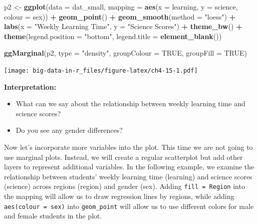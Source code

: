 \documentclass[]{book}
\newenvironment{Shaded}{\begin{snugshade}}{\end{snugshade}}
\newcommand{\DataTypeTok}[1]{\textcolor[rgb]{0.13,0.29,0.53}{#1}}
\newcommand{\KeywordTok}[1]{\textcolor[rgb]{0.13,0.29,0.53}{\textbf{#1}}}
\newcommand{\NormalTok}[1]{#1}
\newcommand{\OperatorTok}[1]{\textcolor[rgb]{0.81,0.36,0.00}{\textbf{#1}}}
\newcommand{\OtherTok}[1]{\textcolor[rgb]{0.56,0.35,0.01}{#1}}
\newcommand{\StringTok}[1]{\textcolor[rgb]{0.31,0.60,0.02}{#1}}
\providecommand{\tightlist}{%
  \setlength{\itemsep}{0pt}\setlength{\parskip}{0pt}}
\begin{document}
\begin{Shaded}
\begin{Highlighting}[]
\NormalTok{p2 <-}\StringTok{ }\KeywordTok{ggplot}\NormalTok{(}\DataTypeTok{data =}\NormalTok{ dat_small,}
             \DataTypeTok{mapping =} \KeywordTok{aes}\NormalTok{(}\DataTypeTok{x =}\NormalTok{ learning, }\DataTypeTok{y =}\NormalTok{ science,}
                           \DataTypeTok{colour =}\NormalTok{ sex)) }\OperatorTok{+}
\StringTok{  }\KeywordTok{geom_point}\NormalTok{() }\OperatorTok{+}
\StringTok{  }\KeywordTok{geom_smooth}\NormalTok{(}\DataTypeTok{method =} \StringTok{"loess"}\NormalTok{) }\OperatorTok{+}
\StringTok{  }\KeywordTok{labs}\NormalTok{(}\DataTypeTok{x =} \StringTok{"Weekly Learning Time"}\NormalTok{, }\DataTypeTok{y =} \StringTok{"Science Scores"}\NormalTok{) }\OperatorTok{+}
\StringTok{  }\KeywordTok{theme_bw}\NormalTok{() }\OperatorTok{+}
\StringTok{  }\KeywordTok{theme}\NormalTok{(}\DataTypeTok{legend.position =} \StringTok{"bottom"}\NormalTok{,}
        \DataTypeTok{legend.title =} \KeywordTok{element_blank}\NormalTok{())}

\KeywordTok{ggMarginal}\NormalTok{(p2, }\DataTypeTok{type =} \StringTok{"density"}\NormalTok{, }\DataTypeTok{groupColour =} \OtherTok{TRUE}\NormalTok{, }\DataTypeTok{groupFill =} \OtherTok{TRUE}\NormalTok{)}
\end{Highlighting}
\end{Shaded}

\texttt{[image: big-data-in-r\_files/figure-latex/ch4-15-1.pdf]}

\textbf{Interpretation:}

\begin{itemize}
\tightlist
\item
  What can we say about the relationship between weekly learning time and science scores?
\item
  Do you see any gender differences?
\end{itemize}

Now let's incorporate more variables into the plot. This time we are not going to use marginal plots. Instead, we will create a regular scatterplot but add other layers to represent additional variables. In the following example, we examine the relationship between students' weekly learning time (learning) and science scores (science) across regions (region) and gender (sex). Adding \texttt{fill\ =\ Region} into the mapping will allow us to draw regression lines by regions, while adding \texttt{aes(colour\ =\ sex)} into \texttt{geom\_point} will allow us to use different colors for male and female students in the plot.
\end{document}
